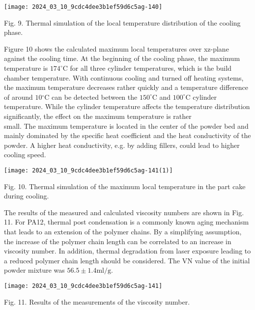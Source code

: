 \documentclass[10pt]{article}
\begin{document}
\begin{center}
\texttt{[image: 2024\_03\_10\_9cdc4dee3b1ef59d6c5ag-140]}
\end{center}

Fig. 9. Thermal simulation of the local temperature distribution of the cooling phase.

Figure 10 shows the calculated maximum local temperatures over xz-plane against the cooling time. At the beginning of the cooling phase, the maximum temperature is $174^{\circ} \mathrm{C}$ for all three cylinder temperatures, which is the build chamber temperature. With continuous cooling and turned off heating systems, the maximum temperature decreases rather quickly and a temperature difference of around $10{ }^{\circ} \mathrm{C}$ can be detected between the $150^{\circ} \mathrm{C}$ and $100^{\circ} \mathrm{C}$ cylinder temperature. While the cylinder temperature affects the temperature distribution significantly, the effect on the maximum temperature is rather\\
small. The maximum temperature is located in the center of the powder bed and mainly dominated by the specific heat coefficient and the heat conductivity of the powder. A higher heat conductivity, e.g. by adding fillers, could lead to higher cooling speed.

\begin{center}
\texttt{[image: 2024\_03\_10\_9cdc4dee3b1ef59d6c5ag-141(1)]}
\end{center}

Fig. 10. Thermal simulation of the maximum local temperature in the part cake during cooling.

The results of the measured and calculated viscosity numbers are shown in Fig. 11. For PA12, thermal post condensation is a commonly known aging mechanism that leads to an extension of the polymer chains. By a simplifying assumption, the increase of the polymer chain length can be correlated to an increase in viscosity number. In addition, thermal degradation from laser exposure leading to a reduced polymer chain length should be considered. The VN value of the initial powder mixture was $56.5 \pm 1.4 \mathrm{ml} / \mathrm{g}$.

\begin{center}
\texttt{[image: 2024\_03\_10\_9cdc4dee3b1ef59d6c5ag-141]}
\end{center}

Fig. 11. Results of the measurements of the viscosity number.
\end{document}
